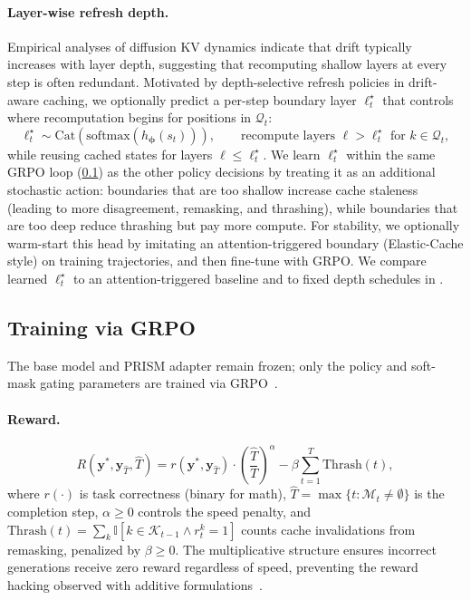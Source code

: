 \documentclass[11pt]{article}
\newcommand{\cM}{\mathcal{M}}
\newcommand{\cK}{\mathcal{K}}
\newcommand{\cQ}{\mathcal{Q}}
\newcommand{\bphi}{\bm{\phi}}
\newcommand{\by}{\mathbf{y}}
\newcommand{\ind}{\mathbb{I}}
\begin{document}
\paragraph{Layer-wise refresh depth.}
Empirical analyses of diffusion KV dynamics indicate that drift typically increases
with layer depth, suggesting that recomputing shallow layers at every step is often redundant.
Motivated by depth-selective refresh policies in drift-aware caching, we optionally predict a per-step
boundary layer $\ell_t^\star$ that controls where recomputation begins for positions in $\cQ_t$:
\begin{equation}
    \ell_t^\star \sim \text{Cat}\!\left(\text{softmax}(h_{\bphi}(s_t))\right),
    \qquad
    \text{recompute layers } \ell > \ell_t^\star \text{ for } k \in \cQ_t,
    \label{eq:learned_boundary_layer}
\end{equation}
while reusing cached states for layers $\ell \le \ell_t^\star$. We learn $\ell_t^\star$ within the same GRPO
loop (\ref{sec:optimization}) as the other policy decisions by treating it as an additional stochastic action: boundaries that are
too shallow increase cache staleness (leading to more disagreement, remasking, and thrashing),
while boundaries that are too deep reduce thrashing but pay more compute. For stability, we optionally
warm-start this head by imitating an attention-triggered boundary (Elastic-Cache style) on training
trajectories, and then fine-tune with GRPO. We compare learned $\ell_t^\star$ to an attention-triggered
baseline and to fixed depth schedules in .

\subsection{Training via GRPO}
\label{sec:optimization}

The base model and PRISM adapter remain frozen; only the policy and soft-mask gating parameters are trained via GRPO~\cite{shao2024deepseekmath}.

\paragraph{Reward.}
\begin{equation}
    R(\by^*, \by_{\hat{T}}, \hat{T}) = r(\by^*, \by_{\hat{T}}) \cdot \left(\frac{\hat{T}}{T}\right)^\alpha - \beta \sum_{t=1}^{T} \text{Thrash}(t),
    \label{eq:reward}
\end{equation}
where $r(\cdot)$ is task correctness (binary for math), $\hat{T} = \max\{t : \cM_t \neq \emptyset\}$ is the completion step, $\alpha \geq 0$ controls the speed penalty, and $\text{Thrash}(t) = \sum_k \ind[k \in \cK_{t-1} \land r_t^k = 1]$ counts cache invalidations from remasking, penalized by $\beta \geq 0$.
The multiplicative structure ensures incorrect generations receive zero reward regardless of speed, preventing the reward hacking observed with additive formulations~\cite{jazbec2025learning}.
\end{document}
